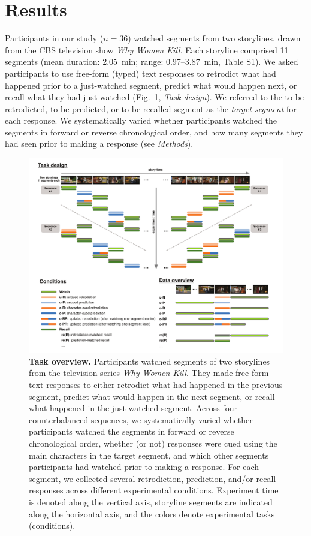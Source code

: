 \documentclass[10pt]{article}
\newcommand{\stimDescription}{S1} %
\begin{document}
\section*{Results}
Participants in our study ($n = 36$) watched segments from two storylines, drawn from the CBS television show \textit{Why Women Kill}.  Each storyline comprised 11 segments (mean duration: 2.05~min; range: 0.97--3.87~min, Table \stimDescription).  We asked participants to use free-form (typed) text responses to retrodict what had happened prior to a just-watched segment, predict what would happen next, or recall what they had just watched (Fig.~\ref{fig:method}, \textit{Task design}). We referred to the to-be-retrodicted, to-be-predicted, or to-be-recalled segment as the \textit{target segment} for each response. We systematically varied whether participants watched the segments in forward or reverse chronological order, and how many segments they had seen prior to making a response (see \textit{Methods}).

\begin{figure}[tp]
  \centering
  \includegraphics[width=\textwidth]{methods}
  \caption{\textbf{Task overview.} Participants watched segments of two storylines from the television series \textit{Why Women Kill}.  They made free-form text responses to either retrodict what had happened in the previous segment, predict what would happen in the next segment, or recall what happened in the just-watched segment. Across four counterbalanced sequences, we systematically varied whether participants watched the segments in forward or reverse chronological order, whether (or not) responses were cued using the main characters in the target segment, and which other segments participants had watched prior to making a response.  For each segment, we collected several retrodiction, prediction, and/or recall responses across different experimental conditions.  Experiment time is denoted along the
  vertical axis, storyline segments are indicated along the horizontal axis, and the colors denote experimental tasks (conditions).}
  \label{fig:method}
\end{figure}
\end{document}
